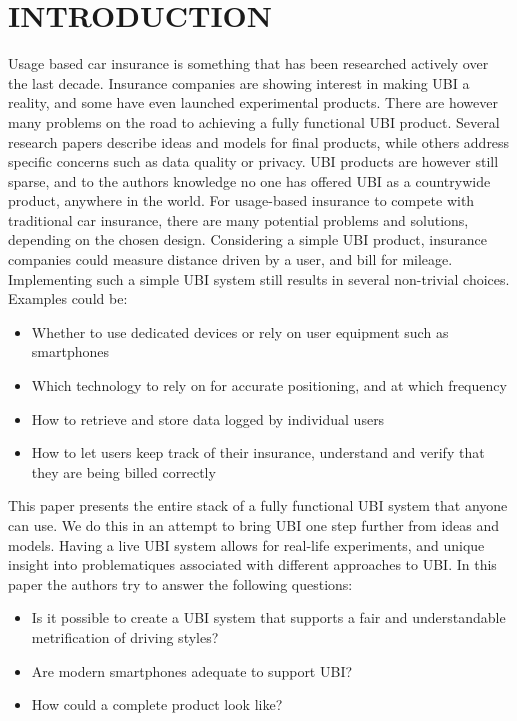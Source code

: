 \section{INTRODUCTION}\label{sec:intro}
Usage based car insurance is something that has been researched actively over the last decade. Insurance companies are showing interest in making UBI a reality, and some have even launched experimental products\citep{qbe_ubi}\citep{progressive_ubi}\citep{allstate_ubi}. There are however many problems on the road to achieving a fully functional UBI product. Several research papers describe ideas and models for final products, while others address specific concerns such as data quality\citep{art:insurtelematics} or privacy\citep{art:pripayd}. UBI products are however still sparse, and to the authors knowledge no one has offered UBI as a countrywide product, anywhere in the world.
For usage-based insurance to compete with traditional car insurance, there are many potential problems and solutions, depending on the chosen design. Considering a simple UBI product, insurance companies could measure distance driven by a user, and bill for mileage. Implementing such a simple UBI system still results in several non-trivial choices. Examples could be:

\begin{itemize}
\item Whether to use dedicated devices or rely on user equipment such as smartphones
\item Which technology to rely on for accurate positioning, and at which frequency
\item How to retrieve and store data logged by individual users
\item How to let users keep track of their insurance, understand and verify that they are being billed correctly
\end{itemize}

This paper presents the entire stack of a fully functional UBI system that anyone can use. We do this in an attempt to bring UBI one step further from ideas and models. Having a live UBI system allows for real-life experiments, and unique insight into problematiques associated with different approaches to UBI. In this paper the authors try to answer the following questions:

\begin{itemize}
\item Is it possible to create a UBI system that supports a fair and understandable metrification of driving styles?
\item Are modern smartphones adequate to support UBI?
\item How could a complete product look like?
\end{itemize}

